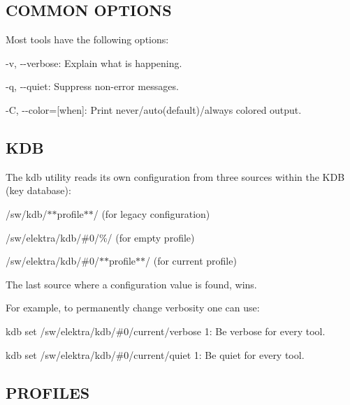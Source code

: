 \subsection*{C\+O\+M\+M\+O\+N O\+P\+T\+I\+O\+N\+S}

Most tools have the following options\+:


\begin{DoxyItemize}
\item {\ttfamily -\/v}, {\ttfamily -\/-\/verbose}\+: Explain what is happening.
\item {\ttfamily -\/q}, {\ttfamily -\/-\/quiet}\+: Suppress non-\/error messages.
\item {\ttfamily -\/\+C}, {\ttfamily -\/-\/color}=\mbox{[}when\mbox{]}\+: Print never/auto(default)/always colored output.
\end{DoxyItemize}

\subsection*{K\+D\+B}

The {\ttfamily kdb} utility reads its own configuration from three sources within the K\+D\+B (key database)\+:


\begin{DoxyEnumerate}
\item /sw/kdb/$\ast$$\ast$profile$\ast$$\ast$/ (for legacy configuration)
\item /sw/elektra/kdb/\#0/\%/ (for empty profile)
\item /sw/elektra/kdb/\#0/$\ast$$\ast$profile$\ast$$\ast$/ (for current profile)
\end{DoxyEnumerate}

The last source where a configuration value is found, wins.

For example, to permanently change verbosity one can use\+:


\begin{DoxyItemize}
\item {\ttfamily kdb set /sw/elektra/kdb/\#0/current/verbose 1}\+: Be verbose for every tool.
\item {\ttfamily kdb set /sw/elektra/kdb/\#0/current/quiet 1}\+: Be quiet for every tool.
\end{DoxyItemize}

\subsection*{P\+R\+O\+F\+I\+L\+E\+S}

